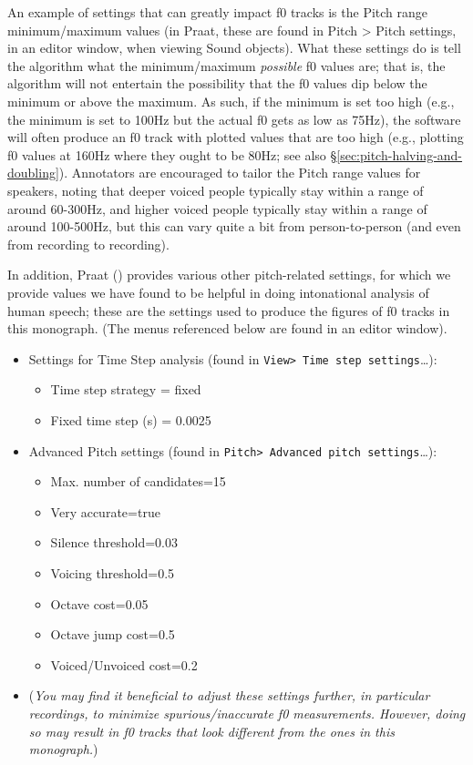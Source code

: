 \documentclass[11pt, twoside]{memoir}
\begin{document}
An example of settings that can greatly impact f0 tracks is the Pitch range minimum\slash maximum values (in Praat, these are found in Pitch > Pitch settings, in an editor window, when viewing Sound objects). What these settings do is tell the algorithm what the minimum\slash maximum \emph{possible} f0 values are; that is, the algorithm will not entertain the possibility that the f0 values dip below the minimum or above the maximum. As such, if the minimum is set too high (e.g., the minimum is set to 100Hz but the actual f0 gets as low as 75Hz), the software will often produce an f0 track with plotted values that are too high (e.g., plotting f0 values at 160Hz where they ought to be 80Hz; see also §\ref{sec:pitch-halving-and-doubling}). Annotators are encouraged to tailor the Pitch range values for speakers, noting that deeper voiced people typically stay within a range of around 60-300Hz, and higher voiced people typically stay within a range of around 100-500Hz, but this can vary quite a bit from person-to-person (and even from recording to recording).


In addition, Praat (\citealt{praat}) provides various other pitch-related settings, for which we provide values we have found to be helpful in doing intonational analysis of human speech; these are the settings used to produce the figures of f0 tracks in this monograph. (The menus referenced below are found in an editor window).

\begin{itemize}
\item Settings for Time Step analysis (found in \texttt{View> Time step settings}\ldots):
	\begin{itemize}
		\item Time step strategy = fixed
		\item Fixed time step (s) = 0.0025
	\end{itemize} 
\item Advanced Pitch settings (found in \texttt{Pitch> Advanced pitch settings}\ldots):
	\begin{itemize}
		\item Max. number of candidates=15
		\item Very accurate=true
		\item Silence threshold=0.03
		\item Voicing threshold=0.5
		\item Octave cost=0.05
		\item Octave jump cost=0.5
		\item Voiced/Unvoiced cost=0.2
	\end{itemize}
\item[] (\textit{You may find it beneficial to adjust these settings further, in particular recordings, to minimize spurious\slash inaccurate f0 measurements. However, doing so may result in f0 tracks that look different from the ones in this monograph.})
\end{itemize}
\end{document}
